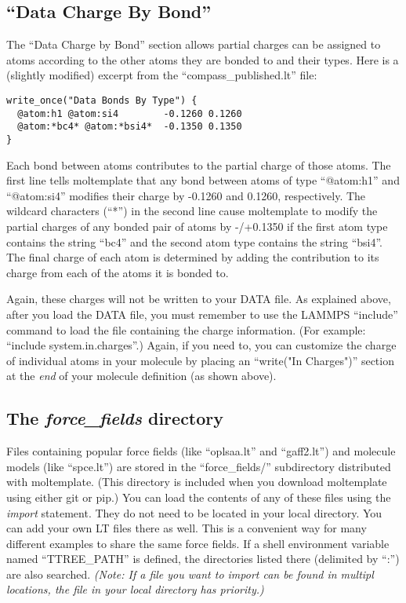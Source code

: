\documentclass[11pt]{article}
\begin{document}
\subsection{``Data Charge By Bond''}
\label{sec:charge_by_bond}

The ``Data Charge by Bond'' section allows partial charges can be assigned
to atoms according to the other atoms they are bonded to and their types.
Here is a (slightly modified) excerpt from the ``compass\_published.lt'' file:
\begin{verbatim}
write_once("Data Bonds By Type") {
  @atom:h1 @atom:si4        -0.1260 0.1260
  @atom:*bc4* @atom:*bsi4*  -0.1350 0.1350
}
\end{verbatim}
Each bond between atoms contributes to the partial charge of those atoms.
The first line tells moltemplate that any bond between atoms of type
``@atom:h1'' and ``@atom:si4'' modifies their charge by
-0.1260 and 0.1260, respectively.
The wildcard characters (``*'') in the second line cause moltemplate to modify
the partial charges of any bonded pair of atoms by -/+0.1350 if the first atom
type contains the string ``bc4'' and the second atom type contains the string
``bsi4''.
The final charge of each atom is determined by adding the contribution to its
charge from each of the atoms it is bonded to.

Again, these charges will not be written to your DATA file.  As explained above,
after you load the DATA file, you must remember to use the LAMMPS ``include''
command to load the file containing the charge information.
(For example: ``include system.in.charges''.)
Again, if you need to, you can customize the
charge of individual atoms in your molecule by placing an
``write("In Charges")'' section at the \textit{end} of your molecule definition
(as shown above).


\subsection{The \textit{force\_fields} directory}
\label{sec:moltemplate_path}
Files containing popular force fields (like ``oplsaa.lt'' and ``gaff2.lt'')
and molecule models (like ``spce.lt'') are stored in the ``force\_fields/''
subdirectory distributed with moltemplate.  (This directory is included when
you download moltemplate using either git or pip.)
You can load the contents of any of these files using the \textit{import}
statement.  They do not need to be located in your local directory.
You can add your own LT files there as well.  This is a convenient
way for many different examples to share the same force fields.
If a shell environment variable named ``TTREE\_PATH'' is defined,
the directories listed there (delimited by ``:'') are also searched.
\textit{(Note: If a file you want to import can be found in multipl locations,
the file in your local directory has priority.)}
\end{document}
